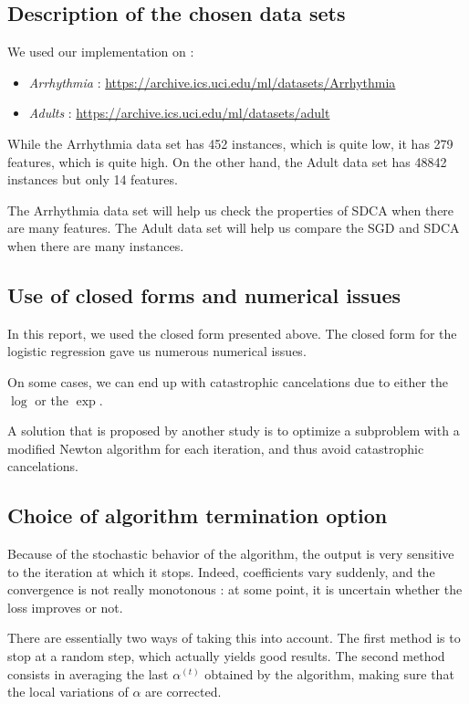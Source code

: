 \documentclass{article}
\begin{document}
\subsection{Description of the chosen data sets}

We used our implementation on :

\begin{itemize}
	\item \textit{Arrhythmia} : \url{https://archive.ics.uci.edu/ml/datasets/Arrhythmia}
	\item \textit{Adults} : \url{https://archive.ics.uci.edu/ml/datasets/adult}
\end{itemize}

While the Arrhythmia data set has 452 instances, which is quite low, it has 279 features, which is quite high.
On the other hand, the Adult data set has 48842 instances but only 14 features.

The Arrhythmia data set will help us check the properties of SDCA when there are many features.
The Adult data set will help us compare the SGD and SDCA when there are many instances.

\subsection{Use of closed forms and numerical issues}

In this report, we used the closed form presented above.
The closed form for the logistic regression gave us numerous numerical issues.

On some cases, we can end up with catastrophic cancelations due to either the $\log$ or the $\exp$.

A solution that is proposed by another study is to optimize a subproblem with a modified Newton algorithm for each iteration, and thus avoid catastrophic cancelations.

\subsection{Choice of algorithm termination option}

Because of the stochastic behavior of the algorithm, the output is very sensitive to the iteration at which it stops.
Indeed, coefficients vary suddenly, and the convergence is not really monotonous : at some point, it is uncertain whether the loss improves or not.

There are essentially two ways of taking this into account.
The first method is to stop at a random step, which actually yields good results.
The second method consists in averaging the last $\alpha^{(t)}$ obtained by the algorithm, making sure that the local variations of $\alpha$ are corrected.
\end{document}
